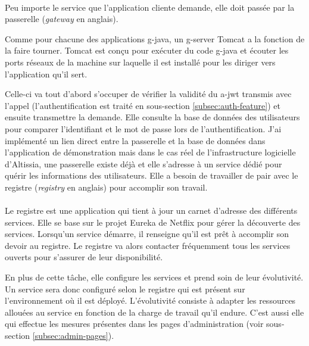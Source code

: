 \paragraph{}
Peu importe le service que l'application cliente demande, elle doit passée par la passerelle (\textit{gateway} en anglais).

Comme pour chacune des applications \gls{g-java}, un \gls{g-server} Tomcat a la fonction de la faire tourner.
Tomcat est conçu pour exécuter du code \gls{g-java} et écouter les ports réseaux de la machine sur laquelle il est installé pour les diriger vers l'application qu'il sert\cite{noauthor_apache_nodate}.

Celle-ci va tout d'abord s'occuper de vérifier la validité du \gls{a-jwt} transmis avec l'appel (l'authentification est traité en sous-section \ref{subsec:auth-feature}) et ensuite transmettre la demande.
Elle consulte la base de données des utilisateurs pour comparer l'identifiant et le mot de passe lors de l'authentification.
J'ai implémenté un lien direct entre la passerelle et la base de données dans l'application de démonstration mais dans le cas réel de l'infrastructure logicielle d'Altissia, une passerelle existe déjà et elle s'adresse à un service dédié pour quérir les informations des utilisateurs.
Elle a besoin de travailler de pair avec le registre (\textit{registry} en anglais) pour accomplir son travail.

\paragraph{}
Le registre est une application qui tient à jour un carnet d'adresse des différents services.
Elle se base sur le projet Eureka de Netflix\cite{noauthor_aws_2019} pour gérer la découverte des services.
Lorsqu'un service démarre, il renseigne qu'il est prêt à accomplir son devoir au registre.
Le registre va alors contacter fréquemment tous les services ouverts pour s'assurer de leur disponibilité.

En plus de cette tâche, elle configure les services et prend soin de leur évolutivité.
Un service sera donc configuré selon le registre qui est présent sur l'environnement où il est déployé.
L'évolutivité consiste à adapter les ressources allouées au service en fonction de la charge de travail qu'il endure.
C'est aussi elle qui effectue les mesures présentes dans les pages d'administration (voir sous-section \ref{subsec:admin-pages}).

